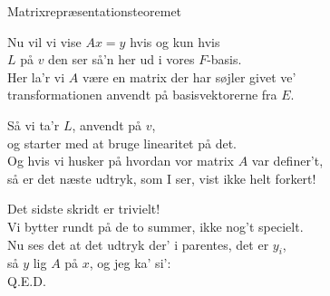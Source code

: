 \begin{song}{Matrixrepræsentationsteoremet}
  \begin{SBVerse}
    Nu vil vi vise $Ax=y$ hvis og kun hvis\\
    $L$ på $v$ den ser så’n her ud i vores $F$-basis.\\
    Her la’r vi $A$ være en matrix der har søjler givet ve’\\
    transformationen anvendt på basisvektorerne fra $E$.
  \end{SBVerse}

  \begin{SBVerse}
    Så vi ta’r $L$, anvendt på $v$,\\
    og starter med at bruge linearitet på det.\\
    Og hvis vi husker på hvordan vor matrix $A$ var definer’t,\\
    så er det næste udtryk, som I ser, vist ikke helt forkert!
  \end{SBVerse}

  \begin{SBVerse}
    Det sidste skridt er trivielt!\\
    Vi bytter rundt på de to summer, ikke nog’t specielt.\\
    Nu ses det at det udtryk der’ i parentes, det er $y_i$,\\
    så $y$ lig $A$ på $x$, og jeg ka’ si':\\
    Q.E.D.
  \end{SBVerse}
\end{song}